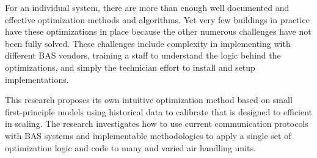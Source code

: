 For an individual system, there are more than enough well documented and effective optimization methods and algorithms. Yet very few buildings in practice have these optimizations in place because the other numerous challenges have not been fully solved. These challenges include complexity in implementing with different BAS vendors, training a staff to understand the logic behind the optimizations, and simply the technician effort to install and setup implementations.

This research proposes its own intuitive optimization method based on small first-principle models using historical data to calibrate that is designed to efficient in scaling. The research investigates how to use current communication protocols with BAS systems and implementable methodologies to apply a single set of optimization logic and code to many and varied air handling units. 
